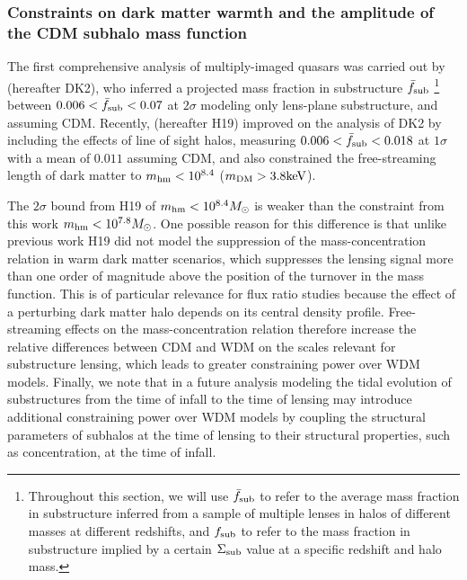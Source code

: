 \subsubsection{Constraints on dark matter warmth and the amplitude of the CDM subhalo mass function}
The first comprehensive analysis of multiply-imaged quasars was carried out by \cite{D+K02} (hereafter DK2), who inferred a projected mass fraction in substructure ${\bar{f}_{\rm{sub}}}$ \footnote{Throughout this section, we will use ${\bar{f}_{\rm{sub}}}$ to refer to the average mass fraction in substructure inferred from a sample of multiple lenses in halos of different masses at different redshifts, and ${{f}_{\rm{sub}}}$ to refer to the mass fraction in substructure implied by a certain $\Sigma_{\rm{sub}}$ value at a specific redshift and halo mass.} between $0.006 < {\bar{f}_{\rm{sub}}} < 0.07$ at $2 \sigma$ modeling only lens-plane substructure, and assuming CDM. Recently, \cite{Hsueh++19} (hereafter H19) improved on the analysis of DK2 by including the effects of line of sight halos, measuring $0.006 < {\bar{f}_{\rm{sub}}} < 0.018$ at $1 \sigma$ with a mean of $0.011$ assuming CDM, and also constrained the free-streaming length of dark matter to ${m_{\rm{hm}}} < 10^{8.4}$ ($m_{\rm{DM}} > 3.8 \rm{keV}$). 

The $2 \sigma$ bound from H19 of ${m_{\rm{hm}}} < 10^{8.4} {M_{\odot}}$ is weaker than the constraint from this work ${m_{\rm{hm}}} < 10^{7.8}{M_{\odot}}$. One possible reason for this difference is that unlike previous work \cite{Birrer++17a,Gilman++18,Gilman++19} H19 did not model the suppression of the mass-concentration relation in warm dark matter scenarios, which suppresses the lensing signal more than one order of magnitude above the position of the turnover in the mass function. This is of particular relevance for flux ratio studies because the effect of a perturbing dark matter halo depends on its central density profile. Free-streaming effects on the mass-concentration relation therefore increase the relative differences between CDM and WDM on the scales relevant for substructure lensing, which leads to greater constraining power over WDM models. Finally, we note that in a future analysis modeling the tidal evolution of substructures from the time of infall to the time of lensing may introduce additional constraining power over WDM models by coupling the structural parameters of subhalos at the time of lensing to their structural properties, such as concentration, at the time of infall.

